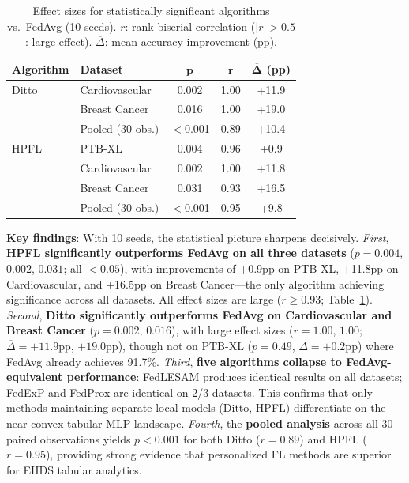 \documentclass[conference,a4paper]{IEEEtran}
\begin{document}
\begin{table}[t]
\centering
\caption{Effect sizes for statistically significant algorithms vs.\ FedAvg (10 seeds). $r$: rank-biserial correlation ($|r| > 0.5$: large effect). $\overline{\Delta}$: mean accuracy improvement (pp).}
\label{tab:effect_sizes}
\small
\begin{tabular}{llccc}
\toprule
\textbf{Algorithm} & \textbf{Dataset} & $\boldsymbol{p}$ & $\boldsymbol{r}$ & $\boldsymbol{\overline{\Delta}}$ \textbf{(pp)} \\
\midrule
Ditto & Cardiovascular & 0.002 & 1.00 & +11.9 \\
 & Breast Cancer & 0.016 & 1.00 & +19.0 \\
 & Pooled (30 obs.) & $<$0.001 & 0.89 & +10.4 \\
\midrule
HPFL & PTB-XL & 0.004 & 0.96 & +0.9 \\
 & Cardiovascular & 0.002 & 1.00 & +11.8 \\
 & Breast Cancer & 0.031 & 0.93 & +16.5 \\
 & Pooled (30 obs.) & $<$0.001 & 0.95 & +9.8 \\
\bottomrule
\end{tabular}
\end{table}

\textbf{Key findings}: With 10 seeds, the statistical picture sharpens decisively. \textit{First}, \textbf{HPFL significantly outperforms FedAvg on all three datasets} ($p = 0.004$, $0.002$, $0.031$; all $< 0.05$), with improvements of +0.9pp on PTB-XL, +11.8pp on Cardiovascular, and +16.5pp on Breast Cancer---the only algorithm achieving significance across all datasets. All effect sizes are large ($r \geq 0.93$; Table~\ref{tab:effect_sizes}). \textit{Second}, \textbf{Ditto significantly outperforms FedAvg on Cardiovascular and Breast Cancer} ($p = 0.002$, $0.016$), with large effect sizes ($r = 1.00$, $1.00$; $\overline{\Delta} = +11.9$pp, $+19.0$pp), though not on PTB-XL ($p = 0.49$, $\Delta = +0.2$pp) where FedAvg already achieves 91.7\%. \textit{Third}, \textbf{five algorithms collapse to FedAvg-equivalent performance}: FedLESAM produces identical results on all datasets; FedExP and FedProx are identical on 2/3 datasets. This confirms that only methods maintaining separate local models (Ditto, HPFL) differentiate on the near-convex tabular MLP landscape. \textit{Fourth}, the \textbf{pooled analysis} across all 30 paired observations yields $p < 0.001$ for both Ditto ($r = 0.89$) and HPFL ($r = 0.95$), providing strong evidence that personalized FL methods are superior for EHDS tabular analytics.
\end{document}
